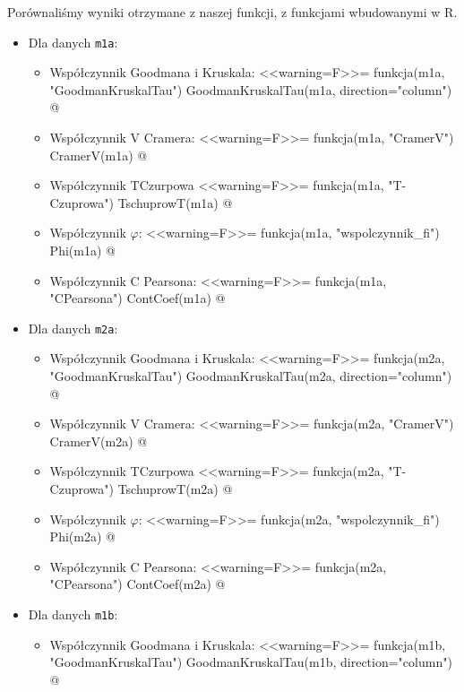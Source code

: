 \documentclass[12pt]{mwart}
\begin{document}
Porównaliśmy wyniki otrzymane z naszej funkcji, z funkcjami wbudowanymi w R.
\begin{itemize}
	\item Dla danych \verb|m1a|:
	\begin{itemize}[label=$\bullet$]
		\item Współczynnik Goodmana i Kruskala:
		<<warning=F>>=
		funkcja(m1a, "GoodmanKruskalTau")
		GoodmanKruskalTau(m1a, direction="column")
		@
		
		\item Współczynnik V Cramera:
		<<warning=F>>=
		funkcja(m1a, "CramerV")
		CramerV(m1a)
		@
		
		\item Współczynnik T{\dywiz}Czurpowa
		<<warning=F>>=
		funkcja(m1a, "T-Czuprowa")
		TschuprowT(m1a)
		@
		
		\item Współczynnik $\varphi$:
		<<warning=F>>=
		funkcja(m1a, "wspolczynnik_fi")
		Phi(m1a)
		@
		
		\item Współczynnik C Pearsona:
		<<warning=F>>=
		funkcja(m1a, "CPearsona")
		ContCoef(m1a)
		@
	\end{itemize}

	\item Dla danych \verb|m2a|:
	\begin{itemize}[label=$\bullet$]
		\item Współczynnik Goodmana i Kruskala:
		<<warning=F>>=
		funkcja(m2a, "GoodmanKruskalTau")
		GoodmanKruskalTau(m2a, direction="column")
		@
		
		\item Współczynnik V Cramera:
		<<warning=F>>=
		funkcja(m2a, "CramerV")
		CramerV(m2a)
		@
		
		\item Współczynnik T{\dywiz}Czurpowa
		<<warning=F>>=
		funkcja(m2a, "T-Czuprowa")
		TschuprowT(m2a)
		@
		
		\item Współczynnik $\varphi$:
		<<warning=F>>=
		funkcja(m2a, "wspolczynnik_fi")
		Phi(m2a)
		@
		
		\item Współczynnik C Pearsona:
		<<warning=F>>=
		funkcja(m2a, "CPearsona")
		ContCoef(m2a)
		@
	\end{itemize}

	\item Dla danych \verb|m1b|:
	\begin{itemize}[label=$\bullet$]
		\item Współczynnik Goodmana i Kruskala:
		<<warning=F>>=
		funkcja(m1b, "GoodmanKruskalTau")
		GoodmanKruskalTau(m1b, direction="column")
		@
		

\end{itemize}
\end{itemize}
\end{document}
